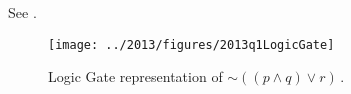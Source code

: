 \begin{subquestions}

\subquestion

See .
\begin{figure}
	\begin{center}
		\texttt{[image: ../2013/figures/2013q1LogicGate]}
		\caption{\label{2013:q1:fig:LogicGates} Logic Gate representation of $\sim((p \land q) \lor r)$\,.}
	\end{center}
\end{figure}

\end{subquestions}

